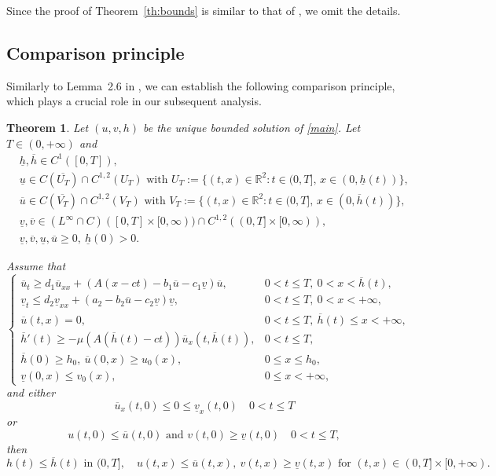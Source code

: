 \documentclass[reqno]{amsart}
\theoremstyle{plain}
\newtheorem{theorem}{Theorem}
\theoremstyle{definition}
\theoremstyle{remark}
\begin{document}
	Since the proof of Theorem~\ref{th:bounds} is similar to that of
	\cite[Theorem~2.5]{MR3327894}, we omit the details.
	
	\subsection{Comparison principle}
	
	Similarly to Lemma~2.6 in \cite{MR3327894}, we can establish the following comparison principle, which plays a crucial role in our subsequent analysis.
	
	\begin{theorem}\label{th:comparison}
		Let $(u,v,h)$ be the unique bounded solution of \eqref{main}. Let $T \in (0,+\infty)$ and
		\begin{align*}
			&\underline{h}, \overline{h} \in C^1([0,T]),\\
			&\underline{u} \in C(\overline{U_T}) \cap C^{1,2}(U_T)
			\text{ with } U_T := \{ (t,x) \in \mathbb{R}^2 : t \in (0, T],\, x \in (0, \underline{h}(t))\},\\
			&\overline{u} \in C(\overline{V_T}) \cap C^{1,2}(V_T)
			\text{ with } V_T := \{ (t,x) \in \mathbb{R}^2 : t \in (0, T],\, x \in (0, \overline{h}(t))\},\\
			&\underline{v}, \overline{v}
			\in (L^{\infty} \cap C)([0,T] \times [0,\infty))
			\cap C^{1,2}((0,T] \times [0,\infty)),\\
			&\underline{v}, \overline{v}, \underline{u}, \overline{u} \ge 0,
			~ \underline{h}(0) > 0.
		\end{align*}
		
		Assume that
		\[
		\begin{cases}
			\overline{u}_t \ge d_1\overline{u}_{xx}
			+ (A(x - ct) - b_1\overline{u} - c_1 \underline{v}) \overline{u},
			& 0 < t \le T,~ 0 < x < \overline{h}(t), \\
			\underline{v}_t \le d_2\underline{v}_{xx}
			+ (a_2 - b_2\overline{u} - c_2\underline{v})\underline{v},
			& 0 < t \le T,~ 0 < x < +\infty, \\
			\overline{u}(t, x) = 0,
			& 0 < t \le T, ~ \overline{h}(t) \leq x < +\infty, \\
			\overline{h}'(t) \ge -\mu (A(\overline{h}(t) - ct))\overline{u}_x(t, \overline{h}(t)),
			& 0 < t \le T, \\
			\overline{h}(0) \ge h_0,~ \overline{u}(0, x) \ge u_0(x),
			& 0 \leq x \leq h_0, \\
			\underline{v}(0, x) \le v_0(x),
			& 0 \le x < +\infty,
		\end{cases}
		\]
		and either
		\[
		\overline{u}_x(t, 0) \le 0 \le \underline{v}_x(t, 0) \quad 0 < t \le T
		\]
		or
		\[
		u(t,0) \le \overline{u}(t,0) \text{ and } v(t,0) \ge \underline{v}(t,0)  \quad 0 < t \le T,
		\]
		then
		\[
		h(t) \le \overline{h}(t) \text{ in } (0,T],\quad
		u(t,x) \le \overline{u}(t,x),~ v(t,x) \ge \underline{v}(t,x)
		\text{ for } (t,x) \in (0,T] \times [0,+\infty).
		\]
		

\end{theorem}
\end{document}
